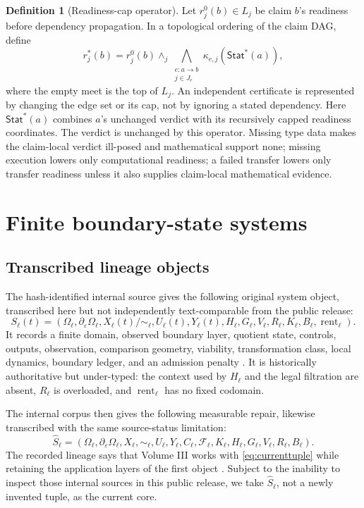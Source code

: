 \documentclass[11pt,a4paper]{article}
\theoremstyle{definition}
\newtheorem{definition}{Definition}[section]
\theoremstyle{plain}
\theoremstyle{remark}
\newcommand{\Stat}{\mathsf{Stat}}
\begin{document}
\begin{definition}[Readiness-cap operator]\label{def:demotion}
Let \(r_j^0(b)\in L_j\) be claim \(b\)'s readiness before dependency
propagation.  In a topological ordering of the claim DAG, define
\[
r_j^*(b)=r_j^0(b)\wedge_j
\bigwedge_{\substack{e:a\to b\\j\in J_e}}
\kappa_{e,j}\!\left(\Stat^*(a)\right),
\]
where the empty meet is the top of \(L_j\).  An independent certificate is
represented by changing the edge set or its cap, not by ignoring a stated
dependency.  Here \(\Stat^*(a)\) combines \(a\)'s unchanged verdict with its
recursively capped readiness coordinates.  The verdict is unchanged by this
operator.  Missing type data
makes the claim-local verdict ill-posed and mathematical support none; missing
execution lowers only computational readiness; a failed transfer lowers only
transfer readiness unless it also supplies claim-local mathematical evidence.
\end{definition}

\section{Finite boundary-state systems}\label{sec:systems}

\subsection{Transcribed lineage objects}

The hash-identified internal source gives the following original system
object, transcribed here but not independently text-comparable from the public
release:
\begin{equation}\label{eq:originaltuple}
S_\ell(t)=
\left(
\Omega_\ell,\partial_\varepsilon\Omega_\ell,
X_\ell(t)/{\sim_\ell},U_\ell(t),Y_\ell(t),H_\ell,G_\ell,V_\ell,
R_\ell,K_\ell,B_\ell,\operatorname{rent}_\ell
\right).
\end{equation}
It records a finite domain, observed boundary layer, quotient state, controls,
outputs, observation, comparison geometry, viability, transformation class,
local dynamics, boundary ledger, and an admission penalty
\citep{BSCvol1}.  It is historically authoritative but under-typed: the context
used by \(H_\ell\) and the legal filtration are absent, \(R_\ell\) is
overloaded, and \(\operatorname{rent}_\ell\) has no fixed codomain.

The internal corpus then gives the following measurable repair, likewise
transcribed with the same source-status limitation:
\begin{equation}\label{eq:currenttuple}
\widehat S_\ell=
\left(
\Omega_\ell,\partial_\varepsilon\Omega_\ell,X_\ell,{\sim_\ell},
U_\ell,Y_\ell,C_\ell,\mathcal F_\ell,K_\ell,H_\ell,G_\ell,V_\ell,
R_\ell,B_\ell
\right).
\end{equation}
The recorded lineage says that Volume III works with
\eqref{eq:currenttuple} while retaining the application layers of the first
object \citep{BSCvol2,BSCvol3}.  Subject to the inability to inspect those
internal sources in this public release, we take \(\widehat S_\ell\), not a
newly invented tuple, as the current core.
\end{document}
